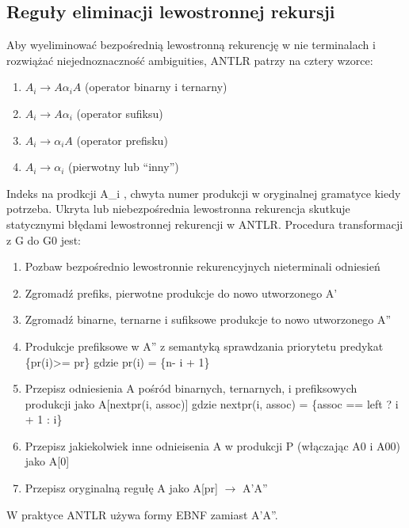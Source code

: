 ﻿\subsection{Reguły eliminacji lewostronnej rekursji}
Aby wyeliminować bezpośrednią lewostronną rekurencję w nie terminalach
i rozwiążać niejednoznaczność ambiguities, ANTLR patrzy na cztery wzorce:
\begin{enumerate}
\item $A_i \rightarrow A\alpha_i A$ (operator binarny i ternarny)
\item $A_i \rightarrow A\alpha_i$ (operator sufiksu)
\item $A_i \rightarrow \alpha_iA$ (operator prefisku)
\item $A_i \rightarrow \alpha_i$ (pierwotny lub “inny”)
\end{enumerate}
Indeks na prodkcji A_i , chwyta numer produkcji 
w oryginalnej gramatyce kiedy potrzeba. Ukryta lub niebezpośrednia 
lewostronna rekurencja skutkuje statycznymi błędami lewostronnej rekurencji w ANTLR.
Procedura transformacji z G do G0 jest:
\begin{enumerate}
\item Pozbaw bezpośrednio lewostronnie rekurencyjnych  nieterminali odniesień
\item Zgromadź prefiks, pierwotne produkcje do nowo utworzonego A'
\item Zgromadź binarne, ternarne i sufiksowe produkcje to nowo utworzonego A''
\item Produkcje prefiksowe w A'' z semantyką sprawdzania priorytetu predykat
\{pr(i)>= pr\} gdzie pr(i) = \{n- i + 1\}
\item Przepisz odniesienia A pośród binarnych, ternarnych, i prefiksowych produkcji
jako A[nextpr(i, assoc)] gdzie
nextpr(i, assoc) = \{assoc == left ? i + 1 : i\}
\item Przepisz jakiekolwiek inne odnieisenia A w produkcji P
(włączając A0 i A00) jako A[0]
\item Przepisz oryginalną regułę A jako A[pr] $\rightarrow$ A'A''
\end{enumerate}
W praktyce ANTLR używa formy EBNF zamiast A'A''.


